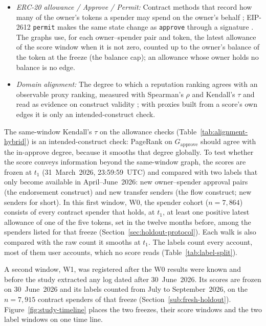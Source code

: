 \begin{itemize}
\item \emph{ERC-20 allowance / Approve / Permit:} Contract methods that record how many of the owner's tokens a spender may spend on the owner's behalf \parencite{vogelsteller2015erc20}; EIP-2612 \texttt{permit} makes the same state change as \texttt{approve} through a signature \parencite{lundfall2020permit}. The graphs use, for each owner--spender pair and token, the latest allowance of the score window when it is not zero, counted up to the owner's balance of the token at the freeze (the balance cap); an allowance whose owner holds no balance is no edge.
\item \emph{Domain alignment:} The degree to which a reputation ranking agrees with an observable proxy ranking, measured with Spearman's $\rho$ \parencite{spearman1904proof} and Kendall's $\tau$ \parencite{kendall1938rank} and read as evidence on construct validity \parencite{cronbach1955construct}; with proxies built from a score's own edges it is only an intended-construct check.
\end{itemize}


The same-window Kendall's $\tau$ on the allowance checks (Table~\ref{tab:alignment-hybrid}) is an intended-construct check: PageRank on $G_{\text{approve}}$ should agree with the in-approve degree, because it smooths that degree globally. To test whether the score conveys information beyond the same-window graph, the scores are frozen at $t_1$ (31~March~2026, 23:59:59~UTC) and compared with two labels that only become available in April--June~2026: new owner--spender approval pairs (the endorsement construct) and new transfer senders (the flow construct; new senders for short). In this first window, W0, the spender cohort ($n=7{,}864$) consists of every contract spender that holds, at $t_1$, at least one positive latest allowance of one of the five tokens, set in the twelve months before, among the spenders listed for that freeze (Section~\ref{sec:holdout-protocol}). Each walk is also compared with the raw count it smooths at $t_1$. The labels count every account, most of them user accounts, which no score reads (Table~\ref{tab:label-split}).

A second window, W1, was registered after the W0 results were known and before the study extracted any log dated after 30~June~2026. Its scores are frozen on 30~June~2026 and its labels counted from July to September~2026, on the $n=7{,}915$ contract spenders of that freeze (Section~\ref{sub:fresh-holdout}). Figure~\ref{fig:study-timeline} places the two freezes, their score windows and the two label windows on one time line.

